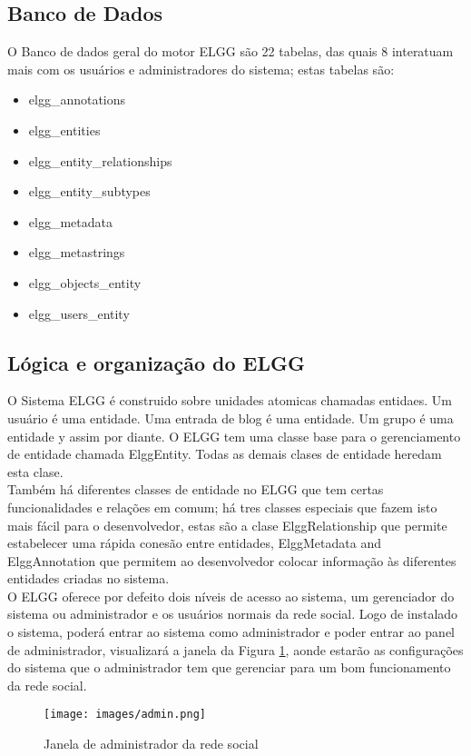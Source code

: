 \documentclass[12pt, letterpaper, onecolumn]{article}
\begin{document}
\subsection{Banco de Dados}
O Banco de dados geral do motor ELGG são 22 tabelas, das quais 8 interatuam mais com os usuários e administradores do sistema; estas tabelas são:
\begin{itemize}
\item elgg\_annotations
\item elgg\_entities
\item elgg\_entity\_relationships
\item elgg\_entity\_subtypes
\item elgg\_metadata
\item elgg\_metastrings
\item elgg\_objects\_entity
\item elgg\_users\_entity
\end{itemize}

\subsection{Lógica e organização do ELGG}
O Sistema ELGG é construido sobre unidades atomicas chamadas entidaes. Um usuário é uma entidade. Uma entrada de blog é uma entidade. Um grupo é uma entidade y assim por diante. O ELGG tem uma classe base para o gerenciamento de entidade chamada ElggEntity. Todas as demais clases de entidade heredam esta clase.\\

Também há diferentes classes de entidade no ELGG que tem certas funcionalidades e relações em comum; há tres classes especiais que fazem isto mais fácil para o desenvolvedor, estas são a clase ElggRelationship que permite estabelecer uma rápida  conesão entre entidades, ElggMetadata and ElggAnnotation que permitem ao desenvolvedor colocar informação às diferentes entidades criadas no sistema.\\

O ELGG oferece por defeito dois níveis de acesso ao sistema, um gerenciador do sistema ou administrador e os usuários normais da rede social. Logo de instalado o sistema, poderá entrar ao sistema como administrador e poder entrar ao panel de administrador, visualizará a janela da Figura \ref{fig:admin}, aonde estarão as configurações do sistema que o administrador tem que gerenciar para um bom funcionamento da rede social. 

\begin{figure}[htpb]
\centering
\texttt{[image: images/admin.png]}
\caption{Janela de administrador da rede social}
\label{fig:admin}
\end{figure}
\end{document}

